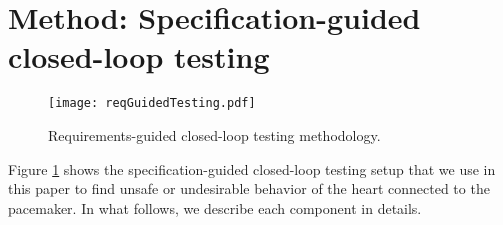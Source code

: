 \section{Method: Specification-guided closed-loop testing}
\label{method}

\begin{figure}[!t]
	\centering
	\texttt{[image: reqGuidedTesting.pdf]}
	\caption{\small Requirements-guided closed-loop testing methodology.}
	\label{fig:reqGuidedTesting}
\end{figure} 

Figure \ref{fig:reqGuidedTesting} shows the specification-guided closed-loop testing setup that we use in this paper to find unsafe or undesirable behavior of the heart connected to the pacemaker.
In what follows, we describe each component in details.





